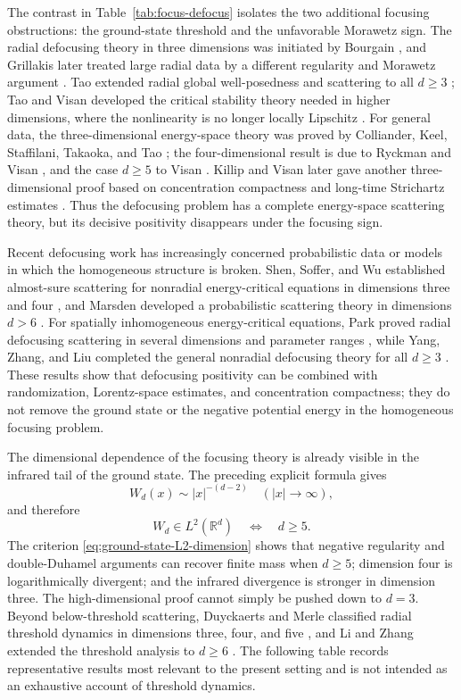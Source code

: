 \documentclass{interact}
\numberwithin{equation}{section}
\theoremstyle{plain}
\theoremstyle{definition}
\theoremstyle{remark}
\newcommand{\R}{\mathbb R}
\begin{document}
The contrast in Table~\ref{tab:focus-defocus} isolates the two additional focusing obstructions: the ground-state threshold and the unfavorable Morawetz sign. The radial defocusing theory in three dimensions was initiated by Bourgain \cite{Bourgain1999}, and Grillakis later treated large radial data by a different regularity and Morawetz argument \cite{Grillakis2000}. Tao extended radial global well-posedness and scattering to all $d\ge3$ \cite{Tao2005}; Tao and Visan developed the critical stability theory needed in higher dimensions, where the nonlinearity is no longer locally Lipschitz \cite{TaoVisan2005}. For general data, the three-dimensional energy-space theory was proved by Colliander, Keel, Staffilani, Takaoka, and Tao \cite{CKSTT2008}; the four-dimensional result is due to Ryckman and Visan \cite{RyckmanVisan2007}, and the case $d\ge5$ to Visan \cite{Visan2007}. Killip and Visan later gave another three-dimensional proof based on concentration compactness and long-time Strichartz estimates \cite{KillipVisan2012}. Thus the defocusing problem has a complete energy-space scattering theory, but its decisive positivity disappears under the focusing sign.

Recent defocusing work has increasingly concerned probabilistic data or models in which the homogeneous structure is broken. Shen, Soffer, and Wu established almost-sure scattering for nonradial energy-critical equations in dimensions three and four \cite{ShenSofferWu2021}, and Marsden developed a probabilistic scattering theory in dimensions $d>6$ \cite{Marsden2022}. For spatially inhomogeneous energy-critical equations, Park proved radial defocusing scattering in several dimensions and parameter ranges \cite{Park2023}, while Yang, Zhang, and Liu completed the general nonradial defocusing theory for all $d\ge3$ \cite{YangZhangLiu2026}. These results show that defocusing positivity can be combined with randomization, Lorentz-space estimates, and concentration compactness; they do not remove the ground state or the negative potential energy in the homogeneous focusing problem.

The dimensional dependence of the focusing theory is already visible in the infrared tail of the ground state. The preceding explicit formula gives
\[
 W_d(x)\sim |x|^{-(d-2)}\quad(|x|\to\infty),
\]
and therefore
\begin{equation}\label{eq:ground-state-L2-dimension}
 W_d\in L^2(\R^d)\quad\Longleftrightarrow\quad d\ge5.
\end{equation}
The criterion \eqref{eq:ground-state-L2-dimension} shows that negative regularity and double-Duhamel arguments can recover finite mass when $d\ge5$; dimension four is logarithmically divergent; and the infrared divergence is stronger in dimension three. The high-dimensional proof cannot simply be pushed down to $d=3$. Beyond below-threshold scattering, Duyckaerts and Merle classified radial threshold dynamics in dimensions three, four, and five \cite{DuyckaertsMerle2009}, and Li and Zhang extended the threshold analysis to $d\ge6$ \cite{LiZhang2009}. The following table records representative results most relevant to the present setting and is not intended as an exhaustive account of threshold dynamics.
\end{document}
